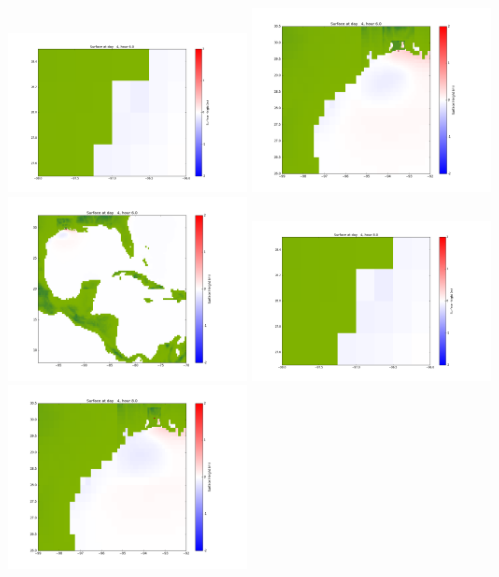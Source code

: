 \documentclass[11pt]{article}
\begin{document}
\vskip 10pt 
\includegraphics[width=0.475\textwidth]{frame0075fig1001.png}
\includegraphics[width=0.475\textwidth]{frame0075fig1002.png}
\vskip 10pt 
\includegraphics[width=0.475\textwidth]{frame0075fig1003.png}
\vskip 10pt 
\includegraphics[width=0.475\textwidth]{frame0076fig1001.png}
\includegraphics[width=0.475\textwidth]{frame0076fig1002.png}
\end{document}
